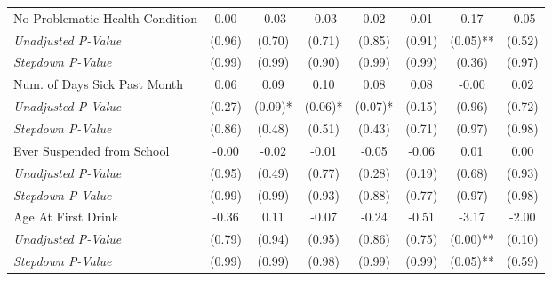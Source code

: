 \begin{tabular}{l c c c c c c c}
No Problematic Health Condition & 0.00 & -0.03 & -0.03 & 0.02 & 0.01 & 0.17 & -0.05 \\
\quad \textit{Unadjusted P-Value} & (0.96) & (0.70) & (0.71) & (0.85) & (0.91) & (0.05)** & (0.52) \\
\quad \textit{Stepdown P-Value} & (0.99) & (0.99) & (0.90) & (0.99) & (0.99) & (0.36) & (0.97) \\
Num. of Days Sick Past Month & 0.06 & 0.09 & 0.10 & 0.08 & 0.08 & -0.00 & 0.02 \\
\quad \textit{Unadjusted P-Value} & (0.27) & (0.09)* & (0.06)* & (0.07)* & (0.15) & (0.96) & (0.72) \\
\quad \textit{Stepdown P-Value} & (0.86) & (0.48) & (0.51) & (0.43) & (0.71) & (0.97) & (0.98) \\
Ever Suspended from School & -0.00 & -0.02 & -0.01 & -0.05 & -0.06 & 0.01 & 0.00 \\
\quad \textit{Unadjusted P-Value} & (0.95) & (0.49) & (0.77) & (0.28) & (0.19) & (0.68) & (0.93) \\
\quad \textit{Stepdown P-Value} & (0.99) & (0.99) & (0.93) & (0.88) & (0.77) & (0.97) & (0.98) \\
Age At First Drink & -0.36 & 0.11 & -0.07 & -0.24 & -0.51 & -3.17 & -2.00 \\
\quad \textit{Unadjusted P-Value} & (0.79) & (0.94) & (0.95) & (0.86) & (0.75) & (0.00)** & (0.10) \\
\quad \textit{Stepdown P-Value} & (0.99) & (0.99) & (0.98) & (0.99) & (0.99) & (0.05)** & (0.59) \\
\bottomrule
\end{tabular}
